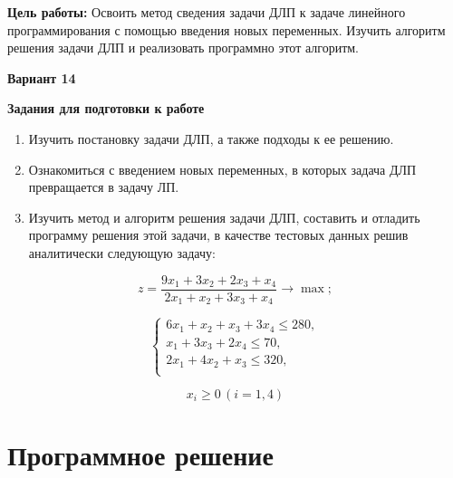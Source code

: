 \documentclass{report}
\begin{document}
	\textbf{Цель работы:} Освоить метод сведения задачи ДЛП к задаче
	линейного программирования с помощью введения новых переменных.
	Изучить алгоритм решения задачи ДЛП и реализовать программно
	этот алгоритм.
	
	\begin{center}
		\textbf{Вариант 14}
	\end{center}
	\begin{center}
		\textbf{Задания для подготовки к работе}
	\end{center}
	
	\begin{enumerate}
		\item{Изучить постановку задачи ДЛП, а также подходы к ее решению.} 
		\item{Ознакомиться с введением новых переменных, в которых задача
			ДЛП превращается в задачу ЛП.} 
		\item{Изучить метод и алгоритм решения задачи ДЛП, составить и
			отладить программу решения этой задачи, в качестве
			тестовых данных решив аналитически следующую задачу:}
	\end{enumerate}
	
	
	\begin{center}
		{
		\begin{equation*}
			z = \frac{9x_1 + 3x_2 + 2x_3 + x_4}{2x_1 + x_2 + 3x_3 + x_4} \rightarrow \max;
		\end{equation*}
		
		\begin{equation*}
			\begin{cases}
				6x_1 + x_2 + x_3 + 3x_4 \leq 280, \\
				x_1 + 3x_3 + 2x_4 \leq 70, \\
				2x_1 + 4x_2 + x_3 \leq 320, \\
				
			\end{cases}
		\end{equation*}
		
		\begin{equation*}
			x_i \geq 0 \, (i = 1, 4)
		\end{equation*}
		}
	\end{center}
	
	
	
	\newpage
	
	\chapter{Программное решение}
	
\end{document}

